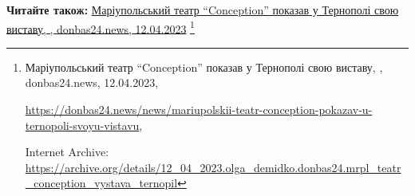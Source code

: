  
 
 
 
 

\def\pubIA{https://archive.org/details/12_04_2023.olga_demidko.donbas24.mrpl_teatr_conception_vystava_ternopil}
\def\pubTitle{Маріупольський театр \enquote{Conception} показав у Тернополі свою виставу}
\def\pubDate{12.04.2023}
\def\pubOrigin{https://donbas24.news/news/mariupolskii-teatr-conception-pokazav-u-ternopoli-svoyu-vistavu}
\def\pubAuthor{\pubAuthorDemidko}
\def\pubSite{donbas24.news}

\textbf{Читайте також:} \href{\pubIA}{%
\pubTitle, \pubAuthor, \pubSite, \pubDate}%
\footnote{\pubTitle, \pubAuthor, \pubSite, \pubDate, \par\url{\pubOrigin}, \par Internet Archive: \url{\pubIA}}
